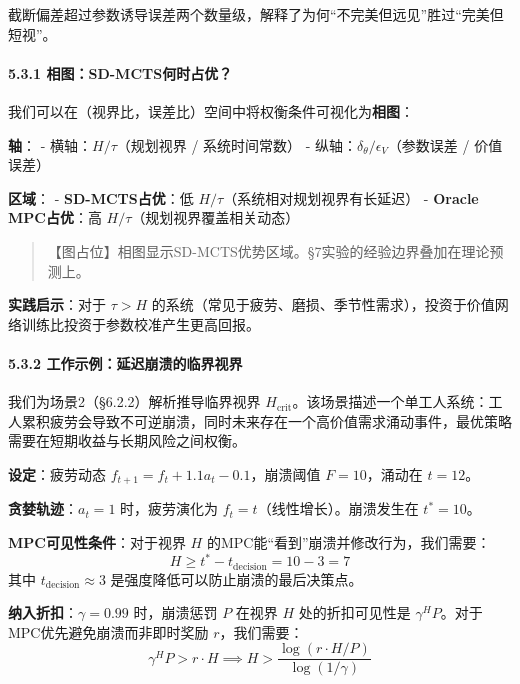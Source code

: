 \documentclass[UTF8]{ctexart}
\let\oldparagraph\paragraph
\renewcommand{\paragraph}[1]{\oldparagraph{#1}\mbox{}}
\begin{document}
截断偏差超过参数诱导误差两个数量级，解释了为何``不完美但远见''胜过``完美但短视''。

\hypertarget{ux76f8ux56fesd-mctsux4f55ux65f6ux5360ux4f18}{%
\paragraph{5.3.1
相图：SD-MCTS何时占优？}\label{ux76f8ux56fesd-mctsux4f55ux65f6ux5360ux4f18}}

我们可以在（视界比，误差比）空间中将权衡条件可视化为\textbf{相图}：

\textbf{轴}： - 横轴：\(H / \tau\)（规划视界 / 系统时间常数） -
纵轴：\(\delta_\theta / \epsilon_V\)（参数误差 / 价值误差）

\textbf{区域}： - \textbf{SD-MCTS占优}：低
\(H/\tau\)（系统相对规划视界有长延迟） - \textbf{Oracle MPC占优}：高
\(H/\tau\)（规划视界覆盖相关动态）

\begin{quote}
【图占位】相图显示SD-MCTS优势区域。§7实验的经验边界叠加在理论预测上。
\end{quote}

\textbf{实践启示}：对于 \(\tau > H\)
的系统（常见于疲劳、磨损、季节性需求），投资于价值网络训练比投资于参数校准产生更高回报。

\hypertarget{ux5de5ux4f5cux793aux4f8bux5ef6ux8fdfux5d29ux6e83ux7684ux4e34ux754cux89c6ux754c}{%
\paragraph{5.3.2
工作示例：延迟崩溃的临界视界}\label{ux5de5ux4f5cux793aux4f8bux5ef6ux8fdfux5d29ux6e83ux7684ux4e34ux754cux89c6ux754c}}

我们为场景2（§6.2.2）解析推导临界视界
\(H_{\text{crit}}\)。该场景描述一个单工人系统：工人累积疲劳会导致不可逆崩溃，同时未来存在一个高价值需求涌动事件，最优策略需要在短期收益与长期风险之间权衡。

\textbf{设定}：疲劳动态 \(f_{t+1} = f_t + 1.1 a_t - 0.1\)，崩溃阈值
\(F = 10\)，涌动在 \(t = 12\)。

\textbf{贪婪轨迹}：\(a_t = 1\) 时，疲劳演化为
\(f_t = t\)（线性增长）。崩溃发生在 \(t^* = 10\)。

\textbf{MPC可见性条件}：对于视界 \(H\)
的MPC能``看到''崩溃并修改行为，我们需要：
\[H \geq t^* - t_{\text{decision}} = 10 - 3 = 7\] 其中
\(t_{\text{decision}} \approx 3\) 是强度降低可以防止崩溃的最后决策点。

\textbf{纳入折扣}：\(\gamma = 0.99\) 时，崩溃惩罚 \(P\) 在视界 \(H\)
处的折扣可见性是 \(\gamma^H P\)。对于MPC优先避免崩溃而非即时奖励
\(r\)，我们需要：
\[\gamma^H P > r \cdot H \implies H > \frac{\log(r \cdot H / P)}{\log(1/\gamma)}\]
\end{document}
